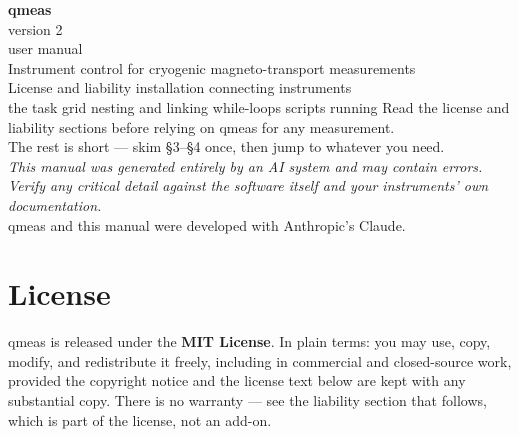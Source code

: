 \documentclass[11pt,a4paper]{article}
\begin{document}
\begin{titlepage}
\centering
\vspace*{3.2cm}
{\Huge\bfseries\color{qblue} qmeas}\\[6pt]
{\LARGE\color{qaccent} version 2}\\[10pt]
{\large user manual}\\[1.4cm]
{\normalsize\color{qgrey} Instrument control for cryogenic magneto-transport measurements}\\[2.5cm]
{\small\color{qgrey}
License and liability \textbullet{} installation \textbullet{} connecting instruments\\
the task grid \textbullet{} nesting and linking \textbullet{} while-loops \textbullet{} scripts \textbullet{} running}
\vfill
{\footnotesize\color{qgrey} Read the license and liability sections before relying on qmeas
for any measurement.\\ The rest is short --- skim \S3--\S4 once, then jump to whatever you need.}\\[1.4em]
{\footnotesize\itshape\color{qwarn} This manual was generated entirely by an AI system and may
contain errors.\\ Verify any critical detail against the software itself and your instruments'
own documentation.}\\[0.8em]
{\footnotesize\color{qgrey} qmeas and this manual were developed with Anthropic's Claude.}
\end{titlepage}

\tableofcontents
\newpage

\section{License}

qmeas is released under the \textbf{MIT License}. In plain terms: you may
use, copy, modify, and redistribute it freely, including in commercial and
closed-source work, provided the copyright notice and the license text below
are kept with any substantial copy. There is no warranty --- see the
liability section that follows, which is part of the license, not an
add-on.
\end{document}
